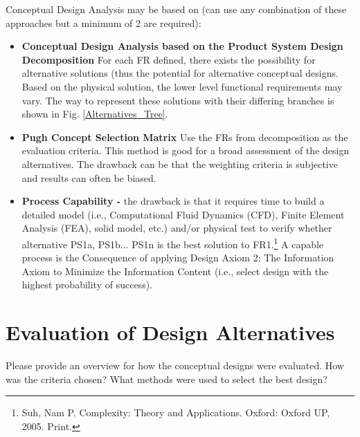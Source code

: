 \documentclass{other/docTemplate}
\begin{document}
Conceptual Design Analysis may be based on (can use any combination of these approaches but a minimum of 2 are required):
\begin{itemize}

\item \textbf{Conceptual Design Analysis based on the Product System Design Decomposition}
 For each FR defined, there exists the possibility for alternative solutions (thus the potential for alternative conceptual designs. Based on the physical solution, the lower level functional requirements may vary. The way to represent these solutions with their differing branches is shown in Fig. \ref{Alternatives_Tree}.

  \item \textbf{Pugh Concept Selection Matrix} Use the FRs from decomposition as the evaluation criteria. This method is good for a broad assessment of the design alternatives. The drawback can be that the weighting criteria is subjective and results can often be biased.
 

\item \textbf{Process Capability -} the drawback is that it requires time to build a detailed model (i.e.,  Computational Fluid Dynamics (CFD), Finite Element Analysis (FEA), solid model, etc.) and/or physical test to verify whether alternative PS1a, PS1b...  PS1n is the best solution to FR1.\footnote{Suh, Nam P. Complexity: Theory and Applications. Oxford: Oxford UP, 2005. Print.}   A capable process is the Consequence of applying Design Axiom 2: The Information Axiom to Minimize the Information Content (i.e., select design with the highest probability of success).

\end{itemize}

\clearpage
\section{Evaluation of Design Alternatives}

Please provide an overview for how the conceptual designs were evaluated. How was the criteria chosen? What methods were used to select the best design?
\end{document}
